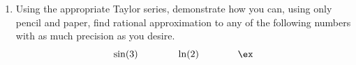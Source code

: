 \begin{enumerate}
    \item 
        Using the appropriate Taylor series,
        demonstrate how you can, using only pencil and paper, 
        find rational approximation to any of the following numbers 
        with as much precision as you desire.
        \begin{equation*}
            \sin(3) \qquad\qquad \ln(2) \qquad\qquad \ex
        \end{equation*}

\end{enumerate}



